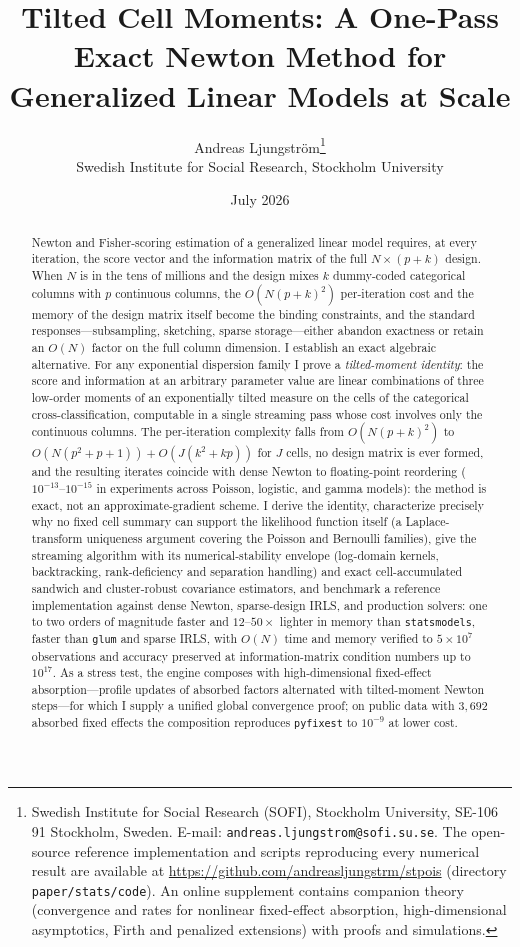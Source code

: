 \documentclass[11pt]{article}
\title{Tilted Cell Moments: A One-Pass Exact Newton Method for
Generalized Linear Models at Scale}
\author{Andreas Ljungstr\"om\thanks{Swedish Institute for Social Research
(SOFI), Stockholm University, SE-106 91 Stockholm, Sweden.
E-mail: \texttt{andreas.ljungstrom@sofi.su.se}.  The open-source
reference implementation and scripts reproducing every numerical result
are available at \url{https://github.com/andreasljungstrm/stpois}
(directory \texttt{paper/stats/code}).  An online supplement contains
companion theory (convergence and rates for nonlinear fixed-effect
absorption, high-dimensional asymptotics, Firth and penalized
extensions) with proofs and simulations.}\\
\small Swedish Institute for Social Research, Stockholm University}
\date{July 2026}
\begin{document}
\maketitle

\begin{abstract}
\noindent
Newton and Fisher-scoring estimation of a generalized linear model
requires, at every iteration, the score vector and the information
matrix of the full $N \times (p + k)$ design.  When $N$ is in the
tens of millions and the design mixes $k$ dummy-coded categorical
columns with $p$ continuous columns, the $O(N(p+k)^2)$ per-iteration
cost and the memory of the design matrix itself become the binding
constraints, and the standard responses---subsampling, sketching,
sparse storage---either abandon exactness or retain an $O(N)$ factor
on the full column dimension.  I establish an exact algebraic
alternative.  For any exponential dispersion family I prove a
\emph{tilted-moment identity}: the score and information at an
arbitrary parameter value are linear combinations of three low-order
moments of an exponentially tilted measure on the cells of the
categorical cross-classification, computable in a single streaming pass
whose cost involves only the continuous columns.  The per-iteration
complexity falls from $O(N(p+k)^2)$ to $O(N(p^2+p+1)) + O(J(k^2+kp))$
for $J$ cells, no design matrix is ever formed, and the resulting
iterates coincide with dense Newton to floating-point reordering
($10^{-13}$--$10^{-15}$ in experiments across Poisson, logistic, and
gamma models): the method is exact, not an approximate-gradient
scheme.  I derive the identity, characterize precisely why no fixed
cell summary can support the likelihood function itself
(a Laplace-transform uniqueness argument covering the Poisson and
Bernoulli families), give the streaming algorithm with its
numerical-stability envelope (log-domain kernels, backtracking,
rank-deficiency and separation handling) and exact cell-accumulated
sandwich and cluster-robust covariance estimators, and benchmark a
reference implementation against dense Newton, sparse-design IRLS, and
production solvers: one to two orders of magnitude faster and
$12$--$50\times$ lighter in memory than \texttt{statsmodels}, faster
than \texttt{glum} and sparse IRLS, with $O(N)$ time and memory
verified to $5 \times 10^7$ observations and accuracy preserved at
information-matrix condition numbers up to $10^{17}$.  As a stress
test, the engine composes with high-dimensional fixed-effect
absorption---profile updates of absorbed factors alternated with
tilted-moment Newton steps---for which I supply a unified global
convergence proof; on public data with $3{,}692$ absorbed fixed
effects the composition reproduces \texttt{pyfixest} to $10^{-9}$ at
lower cost.
\end{abstract}
\end{document}
